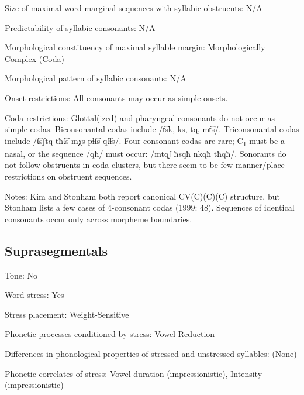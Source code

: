 {\begin{appendixdesc}
\item[Size of maximal word-marginal sequences with syllabic obstruents:] N/A

\item[Predictability of syllabic consonants:] N/A

\item[Morphological constituency of maximal syllable margin:] Morphologically Complex (Coda)

\item[Morphological pattern of syllabic consonants:] N/A

\item[Onset restrictions:] All consonants may occur as simple onsets.

\item[Coda restrictions:] Glottal(ized) and pharyngeal consonants do not occur as simple codas. Biconsonantal codas include /t͡sk, ks, tq, mt͡s/. Triconsonantal codas include /t͡sʃtq tħt͡s mχs pɬt͡s qt͡ɬs/. Four-consonant codas are rare; C\textsubscript{1} must be a nasal, or the sequence /qħ/ must occur: /mtqʃ ħsqħ nkqħ tħqħ/. Sonorants do not follow obstruents in coda clusters, but there seem to be few manner/place restrictions on obstruent sequences.

\item[Notes:] Kim and Stonham both report canonical CV(C)(C)(C) structure, but Stonham lists a few cases of 4-consonant codas (1999: 48). Sequences of identical consonants occur only across morpheme boundaries.
\end{appendixdesc}
\subsection*{Suprasegmentals}
\begin{appendixdesc}
\item[Tone:] No

\item[Word stress:] Yes

\item[Stress placement:] Weight-Sensitive

\item[Phonetic processes conditioned by stress:] Vowel Reduction

\item[Differences in phonological properties of stressed and unstressed syllables:] (None)

\item[Phonetic correlates of stress:] Vowel duration (impressionistic), Intensity (impressionistic)


\end{appendixdesc}}
